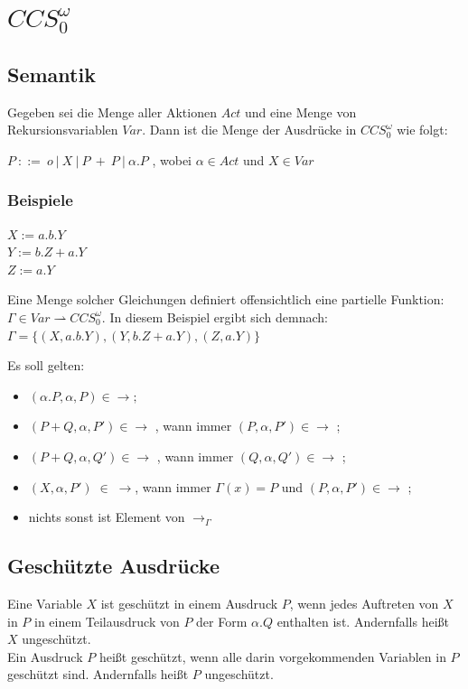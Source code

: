 \documentclass[a4paper,10pt, oneside]{book}
\begin{document}
\section{$CCS_0^{\omega}$}
\subsection{Semantik}
Gegeben sei die Menge aller Aktionen $Act$ und eine Menge von Rekursionsvariablen $Var$. Dann ist die Menge der Ausdrücke in $CCS_0^{\omega}$ wie folgt:\\
\begin{center}
$ P \: ::= \: o \: | \: X \: | \: P \: + \: P \: | \: \alpha.P $ , wobei $\alpha \in Act$ und $X \in Var$ 
\end{center}

\subsubsection{Beispiele}
$ X := a.b.Y $\\
$ Y := b.Z + a.Y $\\
$ Z := a.Y $
\begin{flushleft}
Eine Menge solcher Gleichungen definiert offensichtlich eine partielle Funktion: $\Gamma \in Var \rightharpoonup CCS_0^{\omega}$. In diesem Beispiel ergibt sich demnach: $\Gamma = \{(X,a.b.Y),(Y,b.Z + a.Y),(Z,a.Y)\}$

\bigbreak

Es soll gelten:
\begin{itemize}
 \item $(\alpha.P,\alpha,P) \in \rightarrow ;$
 \item $ (P + Q, \alpha, P') \in \rightarrow$ , wann immer $(P,\alpha,P') \in \rightarrow$ ;
 \item $ (P + Q,\alpha, Q') \in \rightarrow$ , wann immer $(Q,\alpha,Q') \in \rightarrow$ ;
 \item $(X,\alpha,P') \; \in \; \rightarrow$, wann immer $\Gamma(x) = P$ und $ (P, \alpha, P') \in \rightarrow$ ;
 \item nichts sonst ist Element von $\rightarrow_{\Gamma}$
\end{itemize}
 
\end{flushleft}

\subsection{Geschützte Ausdrücke}
Eine Variable $X$ ist geschützt in einem Ausdruck $P$, wenn jedes Auftreten von $X$ in $P$ in einem Teilausdruck von $P$ der Form $\alpha.Q$ enthalten ist. Andernfalls heißt $X$ ungeschützt.\\
Ein Ausdruck $P$ heißt geschützt, wenn alle darin vorgekommenden Variablen in $P$ geschützt sind. Andernfalls heißt $P$ ungeschützt.
\end{document}
